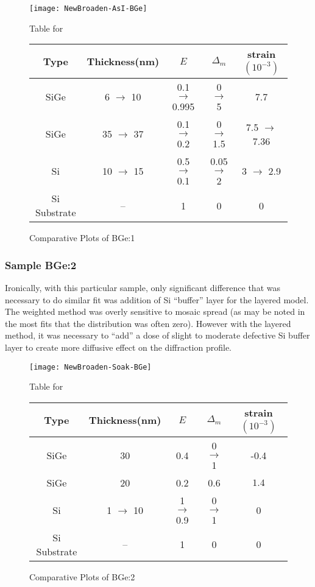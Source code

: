 \begin{figure}[ht]%
\caption{Comparative Plots of  BGe:1}
\label{NBGe1:fig}
\begin{minipage}{\linewidth}
\texttt{[image: NewBroaden-AsI-BGe]}
\end{minipage}
\begin{minipage}{\linewidth}
\centering
\vspace{10pt}
Table for \\
\begin{tabular}[htbp]{@{}c|cccc@{}}
    \hline
  Type & Thickness(nm) & $E$ & $\Delta_m$ & strain $(10^{-3})$ \\
    \hline
  SiGe & 6 $\rightarrow$ 10 & 0.1 $\rightarrow$ 0.995 & 0 $\rightarrow$ 5 & 7.7   \\
  SiGe & 35 $\rightarrow$ 37& 0.1 $\rightarrow$ 0.2& 0 $\rightarrow$ 1.5 & 7.5 $\rightarrow$  7.36\\
  Si & 10 $\rightarrow$ 15& 0.5 $\rightarrow$ 0.1& 0.05 $\rightarrow$ 2 & 3 $\rightarrow$ 2.9 \\
    Si Substrate & -- & 1 & 0 & 0 
  \end{tabular}
\end{minipage}
\end{figure}

\subsubsection{Sample BGe:2}

Ironically, with this particular sample, only significant difference that was necessary to do similar fit was addition of Si ``buffer'' layer for the layered model.  The weighted method was overly sensitive to mosaic spread (as may be noted in the most fits that the distribution was often zero).  However with the layered method, it was necessary to ``add'' a dose of slight to moderate defective Si buffer layer to create more diffusive effect on the diffraction profile.

\begin{figure}[ht]%
\caption{Comparative Plots of BGe:2}
\label{NBGe2:fig}
\begin{minipage}{\linewidth}
\texttt{[image: NewBroaden-Soak-BGe]}
\end{minipage}
\begin{minipage}{\linewidth}
\centering
\vspace{10pt}
Table for \\
\begin{tabular}[htbp]{@{}c|cccc@{}}
    \hline
  Type & Thickness(nm) & $E$ & $\Delta_m$ & strain $(10^{-3})$ \\
    \hline
  SiGe & 30 & 0.4  & 0 $\rightarrow$ 1& -0.4  \\
  SiGe & 20 & 0.2  &  0.6& $1.4 $  \\
Si	&1 $\rightarrow$ 10 & 1 $\rightarrow$0.9  &   0 $\rightarrow$ 1 & 0\\
  Si Substrate & -- & 1 & 0 & 0 
  \end{tabular}
\end{minipage}
\end{figure}

